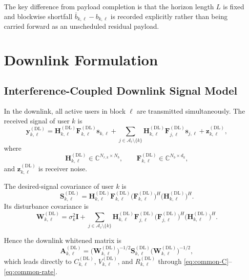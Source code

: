 \documentclass[11pt]{article}
\newcommand{\Aset}{\mathcal{A}}
\newcommand{\C}{\mathbb{C}}
\newcommand{\I}{\mathbf{I}}
\newcommand{\Hc}{\mathbf{H}}
\newcommand{\F}{\mathbf{F}}
\newcommand{\A}{\mathbf{A}}
\newcommand{\Smat}{\mathbf{S}}
\newcommand{\Wmat}{\mathbf{W}}
\newcommand{\DL}{\mathrm{DL}}
\begin{document}
The key difference from payload completion is that the horizon length $L$ is
fixed and blockwise shortfall
$\bar b_{k,\ell}-b_{k,\ell}$ is recorded explicitly rather than being carried
forward as an unscheduled residual payload.

\section{Downlink Formulation}

\subsection{Interference-Coupled Downlink Signal Model}

In the downlink, all active users in block $\ell$ are transmitted
simultaneously. The received signal of user $k$ is
\begin{equation}
\mathbf y_{k,\ell}^{(\DL)}
=
\Hc_{k,\ell}^{(\DL)}\F_{k,\ell}^{(\DL)}\mathbf s_{k,\ell}
+
\sum_{j\in\Aset_\ell\setminus\{k\}}
\Hc_{k,\ell}^{(\DL)}\F_{j,\ell}^{(\DL)}\mathbf s_{j,\ell}
+
\mathbf z_{k,\ell}^{(\DL)},
\label{eq:dl-signal}
\end{equation}
where
\begin{equation}
\Hc_{k,\ell}^{(\DL)} \in \C^{N_{r,k}\times N_b},
\qquad
\F_{k,\ell}^{(\DL)} \in \C^{N_b\times d_k},
\label{eq:dl-dimensions}
\end{equation}
and $\mathbf z_{k,\ell}^{(\DL)}$ is receiver noise.

The desired-signal covariance of user $k$ is
\begin{equation}
\Smat_{k,\ell}^{(\DL)}
=
\Hc_{k,\ell}^{(\DL)}
\F_{k,\ell}^{(\DL)}
\bigl(\F_{k,\ell}^{(\DL)}\bigr)^H
\bigl(\Hc_{k,\ell}^{(\DL)}\bigr)^H.
\label{eq:dl-signal-cov}
\end{equation}
Its disturbance covariance is
\begin{equation}
\Wmat_{k,\ell}^{(\DL)}
=
\sigma_k^2\I
+
\sum_{j\in\Aset_\ell\setminus\{k\}}
\Hc_{k,\ell}^{(\DL)}
\F_{j,\ell}^{(\DL)}
\bigl(\F_{j,\ell}^{(\DL)}\bigr)^H
\bigl(\Hc_{k,\ell}^{(\DL)}\bigr)^H.
\label{eq:dl-disturbance-cov}
\end{equation}

Hence the downlink whitened matrix is
\begin{equation}
\A_{k,\ell}^{(\DL)}
=
\bigl(\Wmat_{k,\ell}^{(\DL)}\bigr)^{-1/2}
\Smat_{k,\ell}^{(\DL)}
\bigl(\Wmat_{k,\ell}^{(\DL)}\bigr)^{-1/2},
\label{eq:dl-A}
\end{equation}
which leads directly to
$C_{k,\ell}^{(\DL)}$, $V_{k,\ell}^{(\DL)}$, and
$R_{k,\ell}^{(\DL)}$ through
\eqref{eq:common-C}--\eqref{eq:common-rate}.
\end{document}
